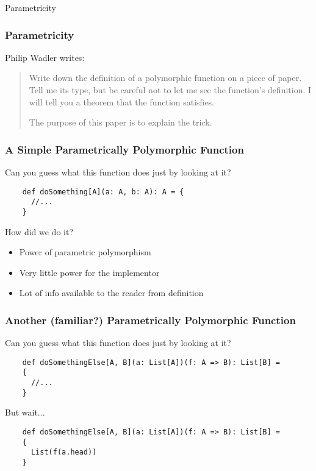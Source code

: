 \begin{section}{Parametricity}
\begin{frame}
\frametitle{Parametricity}
\begin{block}{Philip Wadler \cite{Wadler89theoremsfor} writes:}
\begin{quotation}
Write down the definition of a polymorphic function on a piece of paper. Tell me its type, but be careful not to let me see the function's definition. I will tell you a theorem that the function satisfies.

The purpose of this paper is to explain the trick.
\end{quotation}
\end{block}
\end{frame}

\begin{frame}[fragile]
\frametitle{A Simple Parametrically Polymorphic Function}
  Can you guess what this function does just by looking at it?
  \begin{verbatim}
    def doSomething[A](a: A, b: A): A = {
      //...
    }
  \end{verbatim}
\end{frame}

\begin{frame}{How did we do it?}
  \begin{center}
    \begin{itemize}
    \item Power of parametric polymorphism
    \item Very little power for the implementor
    \item Lot of info available to the reader from definition
    \end{itemize}
\end{center}
\end{frame}

\begin{frame}[fragile]
\frametitle{Another (familiar?) Parametrically Polymorphic Function}
  Can you guess what this function does just by looking at it?
  \begin{verbatim}
    def doSomethingElse[A, B](a: List[A])(f: A => B): List[B] =
    {
      //...
    }
  \end{verbatim}
\end{frame}

\begin{frame}[fragile]{But wait...}
  \begin{verbatim}
    def doSomethingElse[A, B](a: List[A])(f: A => B): List[B] =
    {
      List(f(a.head))
    }
  \end{verbatim}
\end{frame}


\end{section}
